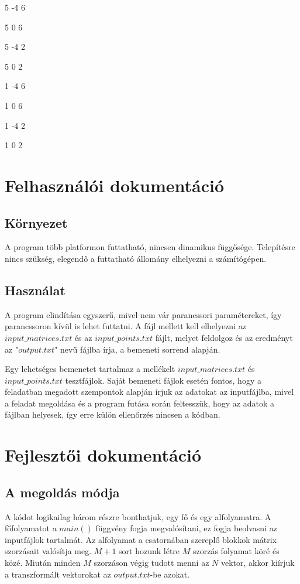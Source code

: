 \documentclass{article}
\begin{document}
5 -4 6

5 0 6

5 -4 2

5 0 2

1 -4 6

1 0 6

1 -4 2

1 0 2

\section{Felhasználói dokumentáció}

\subsection{Környezet}
A program több platformon futtatható, nincsen dinamikus függősége. Telepítésre nincs szükség, elegendő a futtatható állomány elhelyezni a számítógépen.

\subsection{Használat}
A program elindítása egyszerű, mivel nem vár parancssori paramétereket, így parancssoron kívül is lehet futtatni. A fájl mellett kell elhelyezni az $input\_matrices.txt$ és az $input\_points.txt$ fájlt, melyet feldolgoz és az eredményt az "$output.txt$" nevű fájlba írja, a bemeneti sorrend alapján.

Egy lehetséges bemenetet tartalmaz a mellékelt $input\_matrices.txt$ és $input\_points.txt$ tesztfájlok.
Saját bemeneti fájlok esetén fontos, hogy a feladatban megadott szempontok alapján írjuk az adatokat az inputfájlba, mivel a feladat megoldása és a program futása során feltesszük, hogy az adatok a fájlban helyesek, így erre külön ellenőrzés nincsen a kódban.

\section{Fejlesztői dokumentáció}

\subsection{A megoldás módja}
A kódot logikailag három részre bonthatjuk, egy fő és egy alfolyamatra.
A főfolyamatot a $main()$ függvény fogja megvalósítani, ez fogja beolvasni az inputfájlok tartalmát.
Az alfolyamat a csatornában szereplő blokkok mátrix szorzásait valósítja meg.
$M+1$ sort hozunk létre $M$ szorzás folyamat köré és közé.
Miután minden $M$ szorzáson végig tudott menni az $N$ vektor, akkor kiírjuk a transzformált vektorokat az $output.txt$-be azokat.
\end{document}
